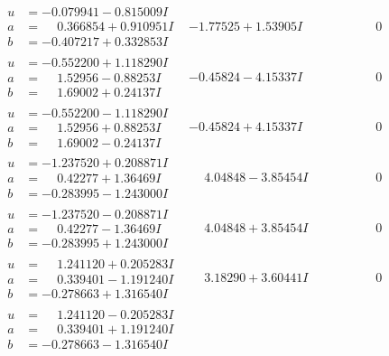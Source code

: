 \documentclass[1p]{elsarticle_modified}
\theoremstyle{definition}
\begin{document}
$$\begin{array}{c|c|c}
\begin{aligned}
u &= -0.079941 - 0.815009 I \\
a &= \phantom{-}0.366854 + 0.910951 I \\
b &= -0.407217 + 0.332853 I\end{aligned}
 & -1.77525 + 1.53905 I & \phantom{-0.000000 } 0 \\ \hline\begin{aligned}
u &= -0.552200 + 1.118290 I \\
a &= \phantom{-}1.52956 - 0.88253 I \\
b &= \phantom{-}1.69002 + 0.24137 I\end{aligned}
 & -0.45824 - 4.15337 I & \phantom{-0.000000 } 0 \\ \hline\begin{aligned}
u &= -0.552200 - 1.118290 I \\
a &= \phantom{-}1.52956 + 0.88253 I \\
b &= \phantom{-}1.69002 - 0.24137 I\end{aligned}
 & -0.45824 + 4.15337 I & \phantom{-0.000000 } 0 \\ \hline\begin{aligned}
u &= -1.237520 + 0.208871 I \\
a &= \phantom{-}0.42277 + 1.36469 I \\
b &= -0.283995 - 1.243000 I\end{aligned}
 & \phantom{-}4.04848 - 3.85454 I & \phantom{-0.000000 } 0 \\ \hline\begin{aligned}
u &= -1.237520 - 0.208871 I \\
a &= \phantom{-}0.42277 - 1.36469 I \\
b &= -0.283995 + 1.243000 I\end{aligned}
 & \phantom{-}4.04848 + 3.85454 I & \phantom{-0.000000 } 0 \\ \hline\begin{aligned}
u &= \phantom{-}1.241120 + 0.205283 I \\
a &= \phantom{-}0.339401 - 1.191240 I \\
b &= -0.278663 + 1.316540 I\end{aligned}
 & \phantom{-}3.18290 + 3.60441 I & \phantom{-0.000000 } 0 \\ \hline\begin{aligned}
u &= \phantom{-}1.241120 - 0.205283 I \\
a &= \phantom{-}0.339401 + 1.191240 I \\
b &= -0.278663 - 1.316540 I\end{aligned}

\end{array}$$
\end{document}
